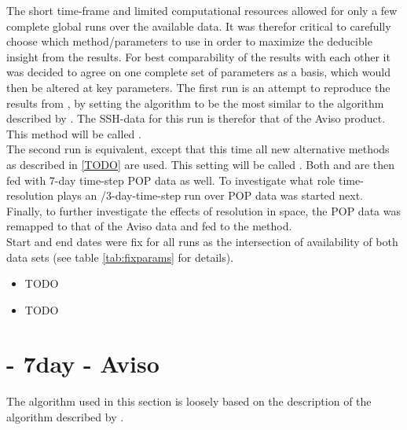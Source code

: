 
The short time-frame and limited computational resources allowed for only a few complete global runs over the available data.
It was therefor critical to carefully choose which method/parameters to use in order to maximize the deducible insight from the results.
For best comparability of the results with each other it was decided to agree on one complete set of parameters as a basis, which would then be altered at key parameters.
The first run is an attempt to reproduce the results from \citet{Chelton2011}, by setting the algorithm to be the most similar to the algorithm described by .  The SSH-data for this run is therefor that of the Aviso product.
This method will be called \MI.\\
 The second run is equivalent, except that this time all new alternative methods as described in \ref{TODO} are used. This setting will be called \MII. Both \MI and \MII are then fed with 7-day time-step POP data as well.
 To investigate what role time-resolution plays an \MII/3-day-time-step run over POP data was started next. Finally, to further investigate the effects of resolution in space, the POP data was remapped to that of the Aviso data and fed to the \MI method.\\
  Start and end dates were fix for all runs as the intersection of availability of both data sets (see table \ref{tab:fixparams} for details).



\begin{itemize}
	\item[\MI]
	TODO 
	\item[\MII]
	TODO 
\end{itemize}

\section{\MI - 7day - Aviso}
The algorithm used in this section is loosely based on the description of the
algorithm described by \citep{Chelton2011}.

